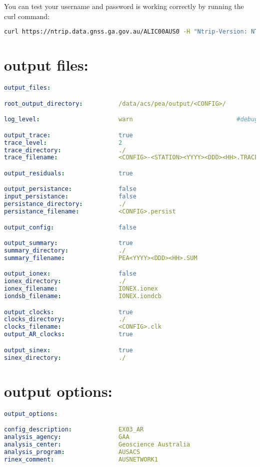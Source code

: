 You can test your username and password is working correctly by running the curl command:
\begin{lstlisting}[language=bash]
curl https://ntrip.data.gnss.ga.gov.au/ALIC00AUS0 -H "Ntrip-Version: NTRIP/2.0" -i  --output - -u <user>
\end{lstlisting}
%
\section{output files:}
\begin{lstlisting}[language=yaml,caption=yaml input files configuration example]
output_files:

root_output_directory:          /data/acs/pea/output/<CONFIG>/

log_level:                      warn                             #debug, info, warn, error as defined in boost::log

output_trace:                   true
trace_level:                    2
trace_directory:                ./
trace_filename:                 <CONFIG>-<STATION><YYYY><DDD><HH>.TRACE

output_residuals:               true

output_persistance:             false
input_persistance:              false
persistance_directory:          ./
persistance_filename:           <CONFIG>.persist

output_config:                  false

output_summary:                 true
summary_directory:              ./
summary_filename:               PEA<YYYY><DDD><HH>.SUM

output_ionex:                   false
ionex_directory:                ./
ionex_filename:                 IONEX.ionex
iondsb_filename:                IONEX.iondcb

output_clocks:                  true
clocks_directory:               ./
clocks_filename:                <CONFIG>.clk
output_AR_clocks:               true

output_sinex:                   true
sinex_directory:                ./
\end{lstlisting}

\section{output options:}

\begin{lstlisting}[language=yaml,caption=yaml input files configuration example]
output_options:

config_description:             EX03_AR
analysis_agency:                GAA
analysis_center:                Geoscience Australia
analysis_program:               AUSACS
rinex_comment:                  AUSNETWORK1
\end{lstlisting}

